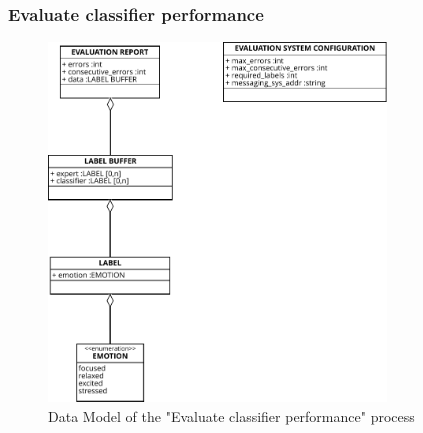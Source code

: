 \subsubsection{Evaluate classifier performance}
\label{sec:data_evaluate_classifier_performance}

\begin{figure}[H]
\centering
\includegraphics[width=0.8\textwidth]{figures/Data Model - Evaluate Classifier Performance.pdf}
\caption{Data Model of the "Evaluate classifier performance" process}
\label{fig:data_evaluate_classifier_performance}
\end{figure}
